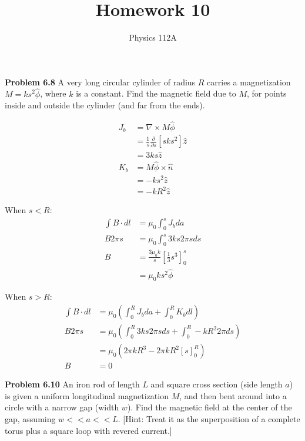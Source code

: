 \documentclass{article}
\title{Homework 10}
\author{Physics 112A}
\date{}
\begin{document}
\maketitle

\textbf{Problem 6.8}
A very long circular cylinder of radius $R$ carries a magnetization $M = k s^2 \hat{\phi}$, where $k$ is a constant.
Find the magnetic field due to $M$, for points inside and outside the cylinder (and far from the ends).

\begin{equation*}
\begin{split}
	J_b & = \nabla \times M \hat{\phi} \\
	& = \frac{1}{s} \frac{\partial}{\partial s} [s k s^2] \hat{z} \\
	& = 3 k s \hat{z} \\
	K_b & = M \hat{\phi} \times \hat{n} \\
	& = - k s^2 \hat{z} \\
	& = - k R^2 \hat{z}
\end{split}
\end{equation*}

When $s < R$:
\begin{equation*}
\begin{split}
	\int B \cdot dl & = \mu_0 \int_0^s J_b da \\
	B 2 \pi s & = \mu_0 \int_0^s 3 k s 2 \pi s ds \\
	B & = \frac{3 \mu_0 k}{s} [\frac{1}{3} s^3]_0^s \\
	& = \boxed{\mu_0 k s^2 \hat{\phi}}
\end{split}
\end{equation*}

When $s > R$:
\begin{equation*}
\begin{split}
	\int B \cdot dl & = \mu_0 (\int_0^R J_b da + \int_0^R K_b dl) \\
	B 2 \pi s & = \mu_0 (\int_0^R 3ks 2 \pi s ds + \int_0^R - k R^2 2 \pi ds) \\
	& = \mu_0 (2 \pi k R^3 - 2 \pi k R^2 [s]_0^R) \\
	B & = \boxed{0}
\end{split}
\end{equation*}

\textbf{Problem 6.10}
An iron rod of length $L$ and square cross section (side length $a$) is given a uniform longitudinal magnetization $M$, and then bent around into a circle with a narrow gap (width $w$).
Find the magnetic field at the center of the gap, assuming $w << a << L$.
[Hint: Treat it as the superposition of a complete torus plus a square loop with revered current.]
\end{document}
